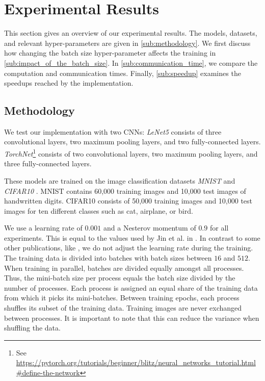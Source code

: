 \documentclass[conference,compsoc,a4paper]{IEEEtran}
\begin{document}

\section{Experimental Results} %
\label{sec:experimental_results}

This section gives an overview of our experimental results.
The models, datasets, and relevant hyper-parameters are given in \autoref{sub:methodology}.
We first discuss how changing the batch size hyper-parameter affects the training in \autoref{sub:impact_of_the_batch_size}.
In \autoref{sub:communication_time}, we compare the computation and communication times.
Finally, \autoref{sub:speedup} examines the speedups reached by the implementation.

\subsection{Methodology} %
\label{sub:methodology}

We test our implementation with two CNNs:
\emph{LeNet5} \cite{lecun1998gradient} consists of three convolutional layers, two maximum pooling layers, and two fully-connected layers.
\emph{TorchNet}\footnote{See \url{https://pytorch.org/tutorials/beginner/blitz/neural_networks_tutorial.html\#define-the-network}} consists of two convolutional layers, two maximum pooling layers, and three fully-connected layers.

These models are trained on the image classification datasets \emph{MNIST} \cite{lecun1998gradient} and \emph{CIFAR10} \cite{krizhevsky2009CIFAR10}.
MNIST contains 60,000 training images and 10,000 test images of handwritten digits.
CIFAR10 consists of 50,000 training images and 10,000 test images for ten different classes such as cat, airplane, or bird.

We use a learning rate of $0.001$ and a Nesterov momentum of $0.9$ for all experiments.
This is equal to the values used by Jin et al. in \cite{jin2016-How-to-scale}.
In contrast to some other publications, like \cite{jin2016-How-to-scale}, we do not adjust the learning rate during the training.
%
The training data is divided into batches with batch sizes between $16$ and $512$.
When training in parallel, batches are divided equally amongst all processes.
Thus, the mini-batch size per process equals the batch size divided by the number of processes.
%
Each process is assigned an equal share of the training data from which it picks its mini-batches.
Between training epochs, each process shuffles its subset of the training data.
Training images are never exchanged between processes.
It is important to note that this can reduce the variance when shuffling the data.
\end{document}
